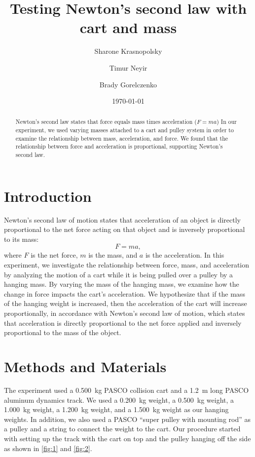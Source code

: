﻿\documentclass[reprint,amsmath,amssymb,aps]{revtex4-2}
\begin{document}
\title{Testing Newton's second law with cart and mass}
\author{Sharone Krasnopolsky}
\author{Timur Neyir}
\author{Brady Gorelczenko}
\date{\today}

\begin{abstract}
Newton’s second law states that force equals mass times acceleration ($F=ma$)
In our experiment, we used varying masses attached to a cart and pulley system in order to
examine the relationship between mass, acceleration, and force. We found that the relationship
between force and acceleration is proportional, supporting Newton’s second law.
\end{abstract}


\maketitle

\section{Introduction}
Newton’s second law of motion states that acceleration of an object is directly proportional to the net force acting on that object and is inversely proportional to its mass:
\begin{equation}
F = ma,
\end{equation}
where $F$ is the net force, $m$ is the mass, and $a$ is the acceleration. In this experiment, we investigate the relationship between force, mass, and acceleration by analyzing the motion of a cart while it is being pulled over a pulley by a hanging mass. By varying the mass of the hanging mass, we examine how the change in force impacts the cart’s acceleration. We hypothesize that if the mass of the hanging weight is increased, then the acceleration of the cart will increase proportionally, in accordance with Newton's second law of motion, which states that acceleration is directly proportional to the net force applied and inversely proportional to the mass of the object.






\section{Methods and Materials}
The experiment used a \qty{0.500}{\kilo\gram} PASCO collision cart and a \qty{1.2}{\meter} long PASCO aluminum dynamics track. We used a \qty{0.200}{\kilo\gram} weight, a \qty{0.500}{\kilo\gram} weight, a \qty{1.000}{\kilo\gram} weight, a \qty{1.200}{\kilo\gram} weight, and a \qty{1.500}{\kilo\gram} weight as our hanging weights. In addition, we also used a PASCO ``super 
pulley with mounting rod'' as a pulley and a string to connect the weight to the cart. Our procedure started with setting up the track with the cart on top and the pulley hanging off the side as shown in \cref{fig:1} and \cref{fig:2}.
\end{document}
